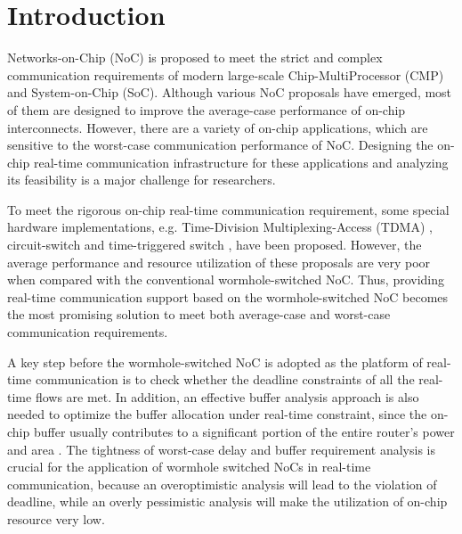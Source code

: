 \documentclass[preprint]{elsarticle}
\begin{document}
\linenumbers

\section{Introduction}
Networks-on-Chip (NoC) is proposed to meet the strict and complex communication requirements of modern large-scale Chip-MultiProcessor (CMP) and System-on-Chip (SoC). Although various NoC proposals have emerged, most of them are designed to improve the average-case performance of on-chip interconnects. However, there are a variety of on-chip applications, which are sensitive to the worst-case communication performance of NoC. Designing the on-chip real-time communication infrastructure for these applications and analyzing its feasibility is a major challenge for researchers.

To meet the rigorous on-chip real-time communication requirement, some special hardware implementations, e.g. Time-Division Multiplexing-Access (TDMA) \cite{GoDR05}, circuit-switch \cite{6628254} and time-triggered switch \cite{4617280}, have been proposed. However, the average performance and resource utilization of these proposals are very poor when compared with the conventional wormhole-switched NoC. Thus, providing real-time communication support based on the wormhole-switched NoC becomes the most promising solution to meet both average-case and worst-case communication requirements.

A key step before the wormhole-switched NoC is adopted as the platform of real-time communication is to check whether the deadline constraints of all the real-time flows are met. In addition, an effective buffer analysis approach is also needed to optimize the buffer allocation under real-time constraint, since the on-chip buffer usually contributes to a significant portion of the entire router's power and area \cite{pkundu,5507566}. The tightness of worst-case delay and buffer requirement analysis is crucial for the application of wormhole switched NoCs in real-time communication, because an overoptimistic analysis will lead to the violation of deadline, while an overly pessimistic analysis will make the utilization of on-chip resource very low.
\end{document}
